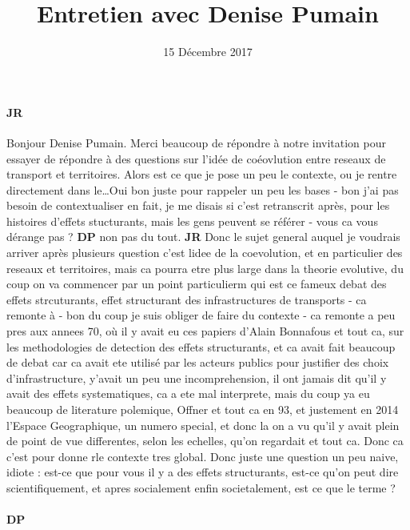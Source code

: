 \documentclass[12pt]{article}
\title{Entretien avec Denise Pumain}
\date{15 Décembre 2017}
\begin{document}
\maketitle

\paragraph{JR}

Bonjour Denise Pumain. Merci beaucoup de répondre à notre invitation pour essayer de répondre à des questions sur l'idée de coéovlution entre reseaux de transport et territoires. Alors est ce que je pose un peu le contexte, ou je rentre directement dans le\ldots Oui bon juste pour rappeler un peu les bases - bon j'ai pas besoin de contextualiser en fait, je me disais si c'est retranscrit après, pour les histoires d'effets stucturants, mais les gens peuvent se référer - vous ca vous dérange pas ? \textbf{DP} non pas du tout. \textbf{JR} Donc le sujet general auquel je voudrais arriver après plusieurs question c'est lidee de la coevolution, et en particulier des reseaux et territoires, mais ca pourra etre plus large dans la theorie evolutive, du coup on va commencer par un point particulierm qui est ce fameux debat des effets strcuturants, effet structurant des infrastructures de transports - ca remonte à - bon du coup je suis obliger de faire du contexte - ca remonte a peu pres aux annees 70, où il y avait eu ces papiers d'Alain Bonnafous et tout ca, sur les methodologies de detection des effets structurants, et ca avait fait beaucoup de debat car ca avait ete utilisé par les acteurs publics pour justifier des choix d'infrastructure, y'avait un peu une incomprehension, il ont jamais dit qu'il y avait des effets systematiques, ca a ete mal interprete, mais du coup ya eu beaucoup de literature polemique, Offner et tout ca en 93, et justement en 2014 l'Espace Geographique, un numero special, et donc la on a vu qu'il y avait plein de point de vue differentes, selon les echelles, qu'on regardait et tout ca. Donc ca c'est pour donne rle contexte tres global. Donc juste une question un peu naive, idiote : est-ce que pour vous il y a des effets structurants, est-ce qu'on peut dire scientifiquement, et apres socialement enfin societalement, est ce que le terme ?


\paragraph{DP}
\end{document}
